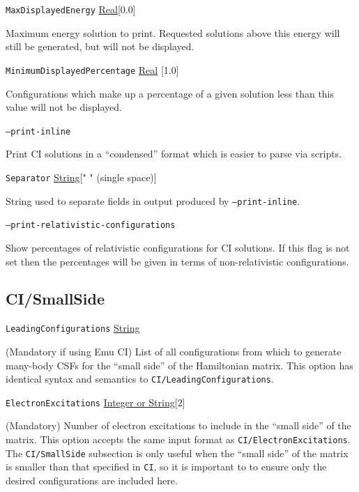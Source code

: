 \documentclass{report}
\begin{document}
\texttt{MaxDisplayedEnergy} \uline{Real}[0.0]
\begin{adjustwidth}{1cm}{}
Maximum energy solution to print. Requested solutions above this energy will still be generated, but
will not be displayed.
\end{adjustwidth}

\texttt{MinimumDisplayedPercentage} \uline{Real} [1.0]
\begin{adjustwidth}{1cm}{}
Configurations which make up a percentage of a given solution less than this value will not be
displayed.
\end{adjustwidth}

\texttt{--print-inline}
\begin{adjustwidth}{1cm}{}
Print CI solutions in a ``condensed'' format which is easier to parse via scripts.
\end{adjustwidth}

\texttt{Separator} \uline{String}[" " (single space)]
\begin{adjustwidth}{1cm}{}
String used to separate fields in output produced by \texttt{--print-inline}.
\end{adjustwidth}

\texttt{--print-relativistic-configurations}
\begin{adjustwidth}{1cm}{}
Show percentages of relativistic configurations for CI solutions. If this flag is not set then the
percentages will be given in terms of non-relativistic configurations.
\end{adjustwidth}

\subsection{CI/SmallSide}
\texttt{LeadingConfigurations} \uline{String}
\begin{adjustwidth}{1cm}{}
(Mandatory if using Emu CI) List of all configurations from which to generate many-body CSFs for the 
``small side'' of the Hamiltonian matrix. This option has identical syntax and semantics to
\texttt{CI/LeadingConfigurations}.
\end{adjustwidth}

\texttt{ElectronExcitations} \uline{Integer or String}[2]
\begin{adjustwidth}{1cm}{}
(Mandatory) Number of electron excitations to include in the ``small side'' of the matrix. This option
accepts the same input format as \texttt{CI/ElectronExcitations}. The \texttt{CI/SmallSide} subsection
is only useful when the ``small side'' of the matrix is smaller than that specified in \texttt{CI}, so
it is important to to ensure only the desired configurations are included here.
\end{adjustwidth}
\end{document}
